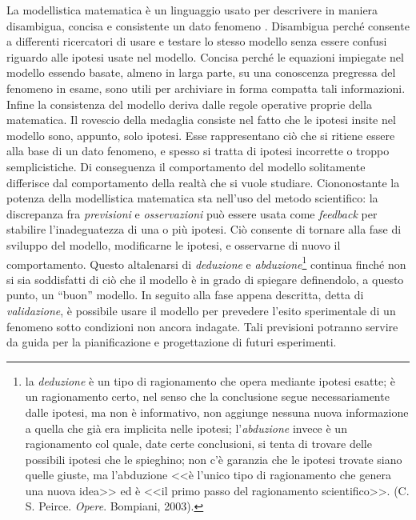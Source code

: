 La modellistica matematica è un linguaggio usato per descrivere in maniera disambigua, concisa e consistente un dato fenomeno \cite{khoo}. Disambigua perché consente a differenti ricercatori di usare e testare lo stesso modello senza essere confusi riguardo alle ipotesi usate nel modello. Concisa perché le equazioni impiegate nel modello essendo basate, almeno in larga parte, su una conoscenza pregressa del fenomeno in esame, sono utili per archiviare in forma compatta tali informazioni. Infine la consistenza del modello deriva dalle regole operative proprie della matematica. Il rovescio della medaglia consiste nel fatto che le ipotesi insite nel modello sono, appunto, solo ipotesi. Esse rappresentano ciò che si ritiene essere alla base di un dato fenomeno, e spesso si tratta di ipotesi incorrette o troppo semplicistiche. Di conseguenza il comportamento del modello solitamente differisce dal comportamento della realtà che si vuole studiare. Ciononostante la potenza della modellistica matematica sta nell'uso del metodo scientifico: la discrepanza fra \textit{previsioni} e \textit{osservazioni} può essere usata come \textit{feedback} per stabilire l'inadeguatezza di una o più ipotesi. Ciò consente di tornare alla fase di sviluppo del modello, modificarne le ipotesi, e osservarne di nuovo il comportamento. Questo altalenarsi di \textit{deduzione} e \textit{abduzione}\footnote{la \textit{deduzione} è un tipo di ragionamento che opera mediante ipotesi esatte; è un ragionamento certo, nel senso che la conclusione segue necessariamente dalle ipotesi, ma non è informativo, non aggiunge nessuna nuova informazione a quella che già era implicita nelle ipotesi; l'\textit{abduzione} invece è un ragionamento col quale, date certe conclusioni, si tenta di trovare delle possibili ipotesi che le spieghino; non c'è garanzia che le ipotesi trovate siano quelle giuste, ma l'abduzione <<è l'unico tipo di ragionamento che genera una nuova idea>> ed è <<il primo passo del ragionamento scientifico>>. (C. S. Peirce. \textit{Opere}. Bompiani, 2003).} continua finché non si sia soddisfatti di ciò che il modello è in grado di spiegare definendolo, a questo punto, un ``buon'' modello. In seguito alla fase appena descritta, detta di \textit{validazione}, è possibile usare il modello per prevedere l'esito sperimentale di un fenomeno sotto condizioni non ancora indagate. Tali previsioni potranno servire da guida per la pianificazione e progettazione di futuri esperimenti.

